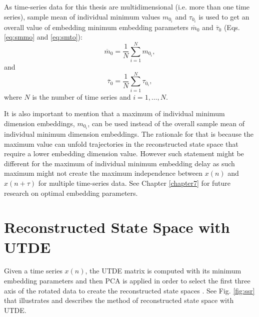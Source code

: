 As time-series data for this thesis are multidimensional 
(i.e. more than one time series), sample mean 
of individual minimum values $m_{0_i}$ and $\tau_{0_i}$  
is used to get an 
overall value of embedding minimum embedding parameters
$\overline{m}_0$ and $\overline{\tau}_0$ (Eqs. \ref{eq:smmo} and \ref{eq:smto}): 
\begin{equation} \label{eq:smmo}
	\overline{m}_0= \frac{1}{N} \sum^{N}_{i = 1} m_{0_i},
\end{equation}
and 
\begin{equation} \label{eq:smto}
	\overline{\tau}_0= \frac{1}{N} \sum^{N}_{i = 1} \tau_{0_i}, 
\end{equation}
where $N$ is the number of time series and $i=1,\dots, N$.

It is also important to mention that a maximum of individual minimum 
dimension embeddings, $m_{0_i}$, can be used instead of the overall 
sample mean of individual minimum dimension embeddings. The rationale
for that is because the maximum value can unfold trajectories 
in the reconstructed state space that require a lower embedding 
dimension value. However such statement might be different 
for the maximum of individual minimum embedding delay as such 
maximum might not create the maximum independence 
between $x(n)$ and $x(n+\tau)$ for multiple time-series data. 
See Chapter \ref{chapter7} for future research on optimal embedding 
parameters.

\section{Reconstructed State Space with UTDE} \label{sec:rsswithUTDE}
Given a time series $x(n)$, the UTDE matrix is computed with its 
minimum embedding parameters and then PCA is applied in order to select 
the first three axis of the rotated data to create the reconstructed 
state spaces \citep{frank2010, sama2013}.
See Fig. \ref{fig:ssr} that illustrates and describes the method of 
reconstructed state space with UTDE.

